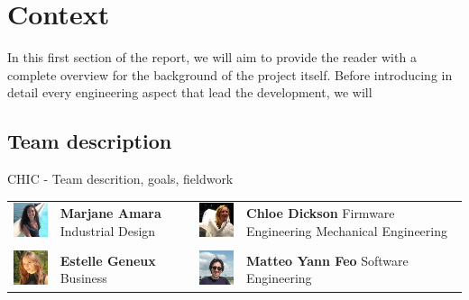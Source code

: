 \newpage
\section{Context}
In this first section of the report, we will aim to provide the reader with a complete overview for the background of the project itself. Before introducing in detail every engineering aspect that lead the development, we will 

\subsection{Team description}
CHIC - Team descrition, goals, fieldwork

\vspace{1cm}
\begin{tabular}{m{2cm}m{5cm}m{2cm}m{5cm}}
    
    \includegraphics[width=2cm]{images/icon_marjane.png} & \textbf{Marjane Amara} \newline Industrial Design &
    \includegraphics[width=2cm]{images/icon_chloe.jpg} & \textbf{Chloe Dickson} \newline Firmware Engineering \newline Mechanical Engineering \\
    
     & & & \\
    
    \includegraphics[width=2cm]{images/icon_estelle.jpg} & \textbf{Estelle Geneux} \newline Business &
    \includegraphics[width=2cm]{images/icon_yann.jpg} & \textbf{Matteo Yann Feo} \newline Software Engineering \\
    

\end{tabular}
